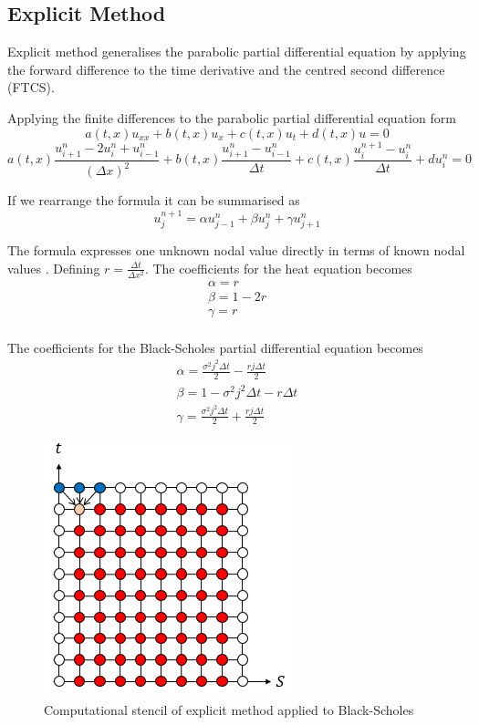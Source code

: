 \documentclass[12pt, oneside]{book}
\theoremstyle{plain}
\theoremstyle{definition}
\begin{document}
\subsection{Explicit Method}
Explicit method generalises the parabolic partial differential equation by applying the forward difference to the time derivative and the centred second difference (FTCS).

Applying the finite differences to the parabolic partial differential equation form
\begin{equation}
a(t, x)  u_{xx} + b(t, x) u_x + c(t, x) u_t + d(t, x) u = 0
\end{equation}
\begin{equation}
a(t, x)  \frac{u^n_{i+1}- 2u^n_i + u^n_{i-1}}{(\Delta x)^2}  + b(t, x)  \frac{u^{n}_{i+1} - u^{n}_{i-1}}{\Delta t} + c(t, x)   \frac{u^{n+1}_i - u^n_i}{\Delta t} + d u^n_i = 0
\end{equation}

If we rearrange the formula it can be summarised as
\begin{equation}
u_j^{n+1} = \alpha u_{j-1}^{n} + \beta u_{j}^{n} + \gamma u_{j+1}^{n}
\end{equation}

The formula expresses one unknown nodal value directly in terms of known nodal values  \cite{evans}. Defining $ r = \frac{\Delta t}{\Delta x^2} $. The coefficients for the heat equation becomes
\begin{eqnarray}
\alpha =  r  \\[10pt]
\beta = 1 - 2r  \\[10pt]
\gamma = r  \\[10pt]
\end{eqnarray}

The coefficients for the Black-Scholes partial differential equation becomes
\begin{eqnarray}
\alpha =  \frac{\sigma^2 j^2 \Delta t}{2} - \frac{r j \Delta t}{2} \\[10pt]
\beta = 1 - \sigma^2 j^2 \Delta t - r \Delta t \\[10pt]
\gamma = \frac{\sigma^2 j^2 \Delta t}{2} + \frac{r j \Delta t}{2}
\end{eqnarray}

\begin{figure}[!htb]
    \centering
        \includegraphics[scale=0.9]{Explicit.png}
    \caption{Computational stencil of explicit method applied to Black-Scholes}
\end{figure}
\end{document}
